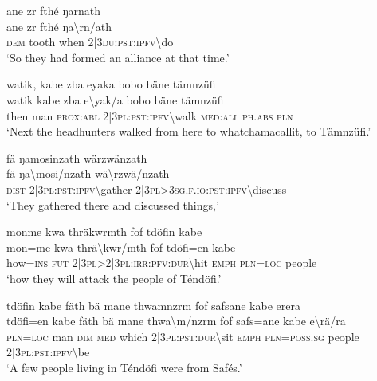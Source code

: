 \ea\label{ex:5:a1452}
ane zr fthé ŋarnath\\
\gll ane	zr	fthé	ŋa{\textbackslash}rn/ath\\
     \textsc{dem}	tooth	when	2|3\textsc{du}:\textsc{pst}:\textsc{ipfv}{\textbackslash}do\\
\glt `So they had formed an alliance at that time.'
\z

\ea\label{ex:5:a1453}
watik, kabe zba eyaka bobo bäne tämnzüfi\\
\gll watik	kabe	zba	e{\textbackslash}yak/a	bobo	bäne	tämnzüfi\\
     then	man	\textsc{prox}:\textsc{abl}	2|3\textsc{pl}:\textsc{pst}:\textsc{ipfv}{\textbackslash}walk	\textsc{med}:\textsc{all}	\textsc{ph}.\textsc{abs}	\textsc{pln}\\
\glt `Next the headhunters walked from here to whatchamacallit, to Tämnzüfi.'
\z

\ea\label{ex:5:a1455}
fä ŋamosinzath wärzwänzath\\
\gll fä	ŋa{\textbackslash}mosi/nzath	wä{\textbackslash}rzwä/nzath\\
     \textsc{dist}	2|3\textsc{pl}:\textsc{pst}:\textsc{ipfv}{\textbackslash}gather	2|3\textsc{pl}>3\textsc{sg}.\textsc{f}.\textsc{io}:\textsc{pst}:\textsc{ipfv}{\textbackslash}discuss\\
\glt `They gathered there and discussed things,'
\z

\newpage
\ea\label{ex:5:a1456}
monme kwa thräkwrmth fof tdöfin kabe\\
\gll mon=me	kwa	thrä{\textbackslash}kwr/mth	fof	tdöfi=en	kabe\\
     how=\textsc{ins}	\textsc{fut}	2|3\textsc{pl}>2|3\textsc{pl}:\textsc{irr}:\textsc{pfv}:\textsc{dur}{\textbackslash}hit	\textsc{emph}	\textsc{pln}=\textsc{loc}	people\\
\glt `how they will attack the people of Téndöfi.'
\z

\ea\label{ex:5:a1458}
tdöfin kabe fäth bä mane thwamnzrm fof safsane kabe erera\\
\gll tdöfi=en	kabe	fäth	bä	mane	thwa{\textbackslash}m/nzrm	fof	safs=ane	kabe	e{\textbackslash}rä/ra\\
     \textsc{pln}=\textsc{loc}	man	\textsc{dim}	\textsc{med}	which	2|3\textsc{pl}:\textsc{pst}:\textsc{dur}{\textbackslash}sit	\textsc{emph}	\textsc{pln}=\textsc{poss}.\textsc{sg}	people	2|3\textsc{pl}:\textsc{pst}:\textsc{ipfv}{\textbackslash}be\\
\glt `A few people living in Téndöfi were from Safés.'
\z

